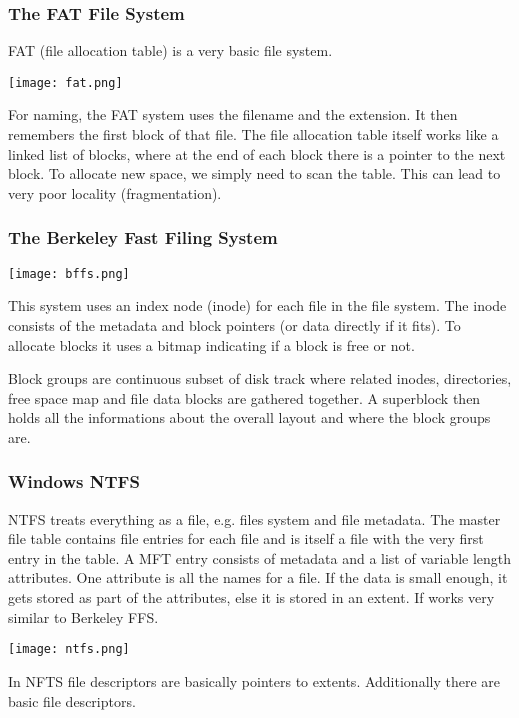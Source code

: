 \subsubsection{The FAT File System}

FAT (file allocation table) is a very basic file system.
\begin{center}
	\texttt{[image: fat.png]}
\end{center}

For naming, the FAT system uses the filename and the extension. It then remembers the first block of that file. The file allocation table itself works like a linked list of blocks, where at the end of each block there is a pointer to the next block. To allocate new space, we simply need to scan the table. This can lead to very poor locality (fragmentation).

\subsubsection{The Berkeley Fast Filing System}

\begin{center}
	\texttt{[image: bffs.png]}
\end{center}

This system uses an index node (inode) for each file in the file system. The inode consists of the metadata and block pointers (or data directly if it fits). To allocate blocks it uses a bitmap indicating if a block is free or not. \medskip

Block groups are continuous subset of disk track  where related inodes, directories, free space map and file data blocks are gathered together. A superblock then holds all the informations about the overall layout and where the block groups are.

\subsubsection{Windows NTFS}

NTFS treats everything as a file, e.g. files system and file metadata. The master file table contains file entries for each file and is itself a file with the very first entry in the table. A MFT entry consists of metadata and a list of variable length attributes. One attribute is all the names for a file. If the data is small enough, it gets stored as part of the attributes, else it is stored in an extent. If works very similar to Berkeley FFS.

\begin{center}
	\texttt{[image: ntfs.png]}
\end{center}

In NFTS file descriptors are basically pointers to extents. Additionally there are basic file descriptors.

